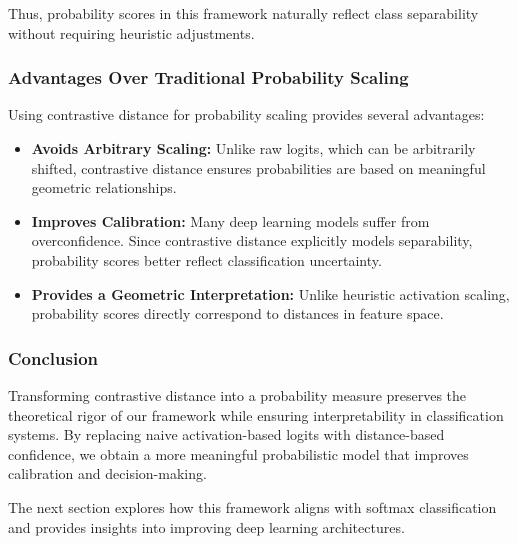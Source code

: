 Thus, probability scores in this framework naturally reflect class separability without requiring heuristic adjustments.

\subsubsection{Advantages Over Traditional Probability Scaling}

Using contrastive distance for probability scaling provides several advantages:

\begin{itemize}
    \item \textbf{Avoids Arbitrary Scaling:} Unlike raw logits, which can be arbitrarily shifted, contrastive distance ensures probabilities are based on meaningful geometric relationships.
    \item \textbf{Improves Calibration:} Many deep learning models suffer from overconfidence. Since contrastive distance explicitly models separability, probability scores better reflect classification uncertainty.
    \item \textbf{Provides a Geometric Interpretation:} Unlike heuristic activation scaling, probability scores directly correspond to distances in feature space.
\end{itemize}

\subsubsection{Conclusion}

Transforming contrastive distance into a probability measure preserves the theoretical rigor of our framework while ensuring interpretability in classification systems. By replacing naive activation-based logits with distance-based confidence, we obtain a more meaningful probabilistic model that improves calibration and decision-making.

The next section explores how this framework aligns with softmax classification and provides insights into improving deep learning architectures.
